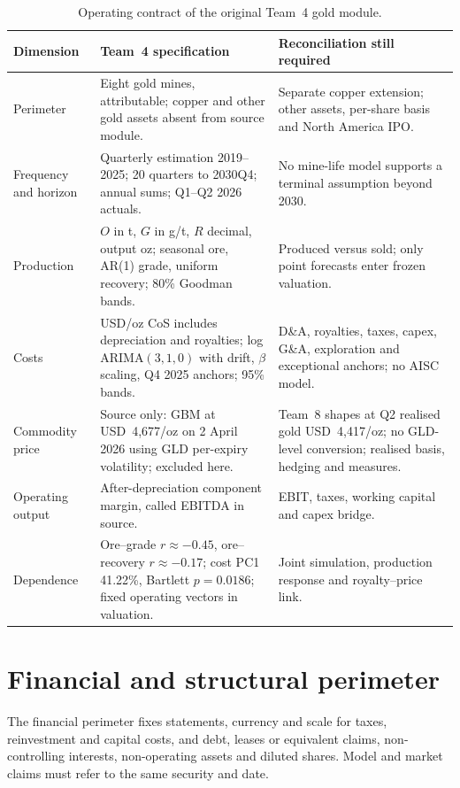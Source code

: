 \begin{table}[H]
\centering
\caption{Operating contract of the original Team~4 gold module.}
\label{tab:company-operating-contract}
\small
\renewcommand{\arraystretch}{1.12}
\begin{tabularx}{\textwidth}{@{}p{2.15cm}X X@{}}
\toprule
\textbf{Dimension} & \textbf{Team~4 specification} &
\textbf{Reconciliation still required} \\
\midrule
Perimeter & Eight gold mines, attributable; copper and other gold assets
absent from source module. & Separate copper extension; other assets,
per-share basis and North America IPO. \\
Frequency and horizon & Quarterly estimation 2019--2025; 20 quarters to
2030Q4; annual sums; Q1--Q2 2026 actuals. & No mine-life model supports a
terminal assumption beyond 2030. \\
Production & $O$ in t, $G$ in g/t, $R$ decimal, output oz; seasonal ore,
AR(1) grade, uniform recovery; 80\% Goodman bands. & Produced versus sold;
only point forecasts enter frozen valuation. \\
Costs & USD/oz CoS includes depreciation and royalties; log ARIMA$(3,1,0)$
with drift, $\beta$ scaling, Q4 2025 anchors; 95\% bands. & D\&A, royalties,
taxes, capex, G\&A, exploration and exceptional anchors; no AISC model. \\
Commodity price & Source only: GBM at USD~4,677/oz on 2 April 2026 using GLD
per-expiry volatility; excluded here. & Team~8 shapes at Q2 realised gold
USD~4,417/oz; no GLD-level conversion; realised basis, hedging and measures. \\
Operating output & After-depreciation component margin, called EBITDA in
source. & EBIT, taxes, working capital and capex bridge. \\
Dependence & Ore--grade $r\approx-0.45$, ore--recovery $r\approx-0.17$;
cost PC1 41.22\%, Bartlett $p=0.0186$; fixed operating vectors in valuation.
& Joint simulation, production response and royalty--price link. \\
\bottomrule
\end{tabularx}
\end{table}

\section{Financial and structural perimeter}
\label{sec:company-financial-perimeter}

The financial perimeter fixes statements, currency and scale for taxes,
reinvestment and capital costs, and debt, leases or equivalent claims,
non-controlling interests, non-operating assets and diluted shares. Model and
market claims must refer to the same security and date.

